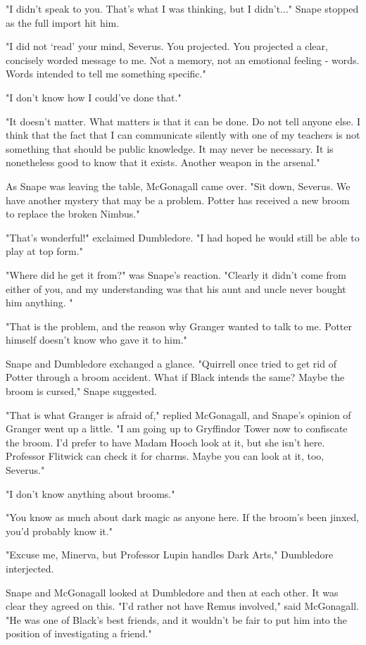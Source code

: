 \documentclass[a4paper,11pt]{article}
\begin{document}
"I didn't speak to you. That's what I was thinking, but I didn't..." Snape stopped as the full import hit him.

"I did not `read' your mind, Severus. You projected. You projected a clear, concisely worded message to me. Not a memory, not an emotional feeling - words. Words intended to tell me something specific."

"I don't know how I could've done that."

"It doesn't matter. What matters is that it can be done. Do not tell anyone else. I think that the fact that I can communicate silently with one of my teachers is not something that should be public knowledge. It may never be necessary. It is nonetheless good to know that it exists. Another weapon in the arsenal."

As Snape was leaving the table, McGonagall came over. "Sit down, Severus. We have another mystery that may be a problem. Potter has received a new broom to replace the broken Nimbus."

"That's wonderful!" exclaimed Dumbledore. "I had hoped he would still be able to play at top form."

"Where did he get it from?" was Snape's reaction. "Clearly it didn't come from either of you, and my understanding was that his aunt and uncle never bought him anything. "

"That is the problem, and the reason why Granger wanted to talk to me. Potter himself doesn't know who gave it to him."

Snape and Dumbledore exchanged a glance. "Quirrell once tried to get rid of Potter through a broom accident. What if Black intends the same? Maybe the broom is cursed," Snape suggested.

"That is what Granger is afraid of," replied McGonagall, and Snape's opinion of Granger went up a little. "I am going up to Gryffindor Tower now to confiscate the broom. I'd prefer to have Madam Hooch look at it, but she isn't here. Professor Flitwick can check it for charms. Maybe you can look at it, too, Severus."

"I don't know anything about brooms."

"You know as much about dark magic as anyone here. If the broom's been jinxed, you'd probably know it."

"Excuse me, Minerva, but Professor Lupin handles Dark Arts," Dumbledore interjected.

Snape and McGonagall looked at Dumbledore and then at each other. It was clear they agreed on this. "I'd rather not have Remus involved," said McGonagall. "He was one of Black's best friends, and it wouldn't be fair to put him into the position of investigating a friend."
\end{document}

